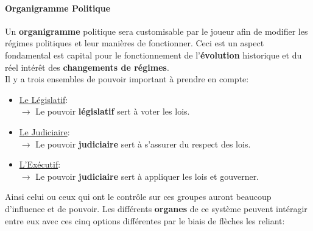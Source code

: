 \documentclass{article}
\begin{document}
                \paragraph{Organigramme Politique}
                    Un \textbf{organigramme} politique sera customisable par le joueur afin de modifier les régimes politiques et leur manières de fonctionner. Ceci est un aspect fondamental est capital pour le fonctionnement de l'\textbf{évolution} historique et du réel intérêt des \textbf{changements de régimes}.\\
                    Il y a trois ensembles de pouvoir important à prendre en compte:
                        \begin{itemize}
                            \item \underline{Le Législatif}:\\
                                $\rightarrow$ Le pouvoir \textbf{législatif} sert à voter les lois.
                            \item \underline{Le Judiciaire}:\\
                                $\rightarrow$ Le pouvoir \textbf{judiciaire} sert à s’assurer du respect des lois.
                            \item \underline{L'Exécutif}:\\
                                $\rightarrow$ Le pouvoir \textbf{judiciaire} sert à appliquer les lois et gouverner.
                        \end{itemize}
                    Ainsi celui ou ceux qui ont le contrôle sur ces groupes auront beaucoup d’influence et de pouvoir. 
                    Les différents \textbf{organes} de ce système peuvent intéragir entre eux avec ces cinq options différentes par le biais de flèches les reliant:
\end{document}
